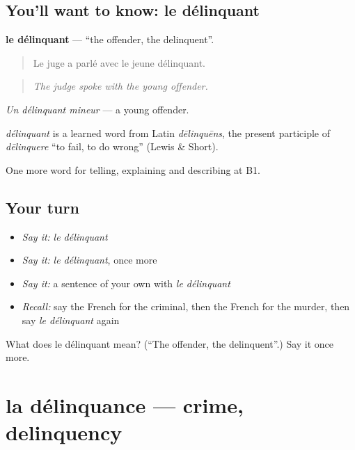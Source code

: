 \subsection*{You'll want to know: le délinquant}
\textbf{le délinquant} — \textquotedblleft{}the offender, the delinquent\textquotedblright{}.

\begin{quote}
Le juge a parlé avec le jeune délinquant.
\end{quote}

\begin{quote}
\emph{The judge spoke with the young offender.}
\end{quote}

\emph{Un délinquant mineur} — a young offender.

\begin{cousinweb}
\emph{délinquant} is a learned word from Latin \emph{dēlinquēns}, the present participle of \emph{dēlinquere} \textquotedblleft{}to fail, to do wrong\textquotedblright{} (Lewis \& Short).
\end{cousinweb}

\begin{grammarlens}[title={What you've built}]
One more word for telling, explaining and describing at B1.
\end{grammarlens}

\subsection*{Your turn}
\begin{itemize}
\raggedright
  \item \emph{Say it:} \emph{le délinquant}
  \item \emph{Say it:} \emph{le délinquant}, once more
  \item \emph{Say it:} a sentence of your own with \emph{le délinquant}
  \item \emph{Recall:} say the French for the criminal, then the French for the murder, then say \emph{le délinquant} again
\end{itemize}

\begin{tcolorbox}[breakable,colback=teal!4,colframe=teal!35!black,title={Before you move on}]
What does le délinquant mean? (\textquotedblleft{}The offender, the delinquent\textquotedblright{}.) Say it once more.
\end{tcolorbox}
\section[la délinquance]{la délinquance — crime, delinquency}

